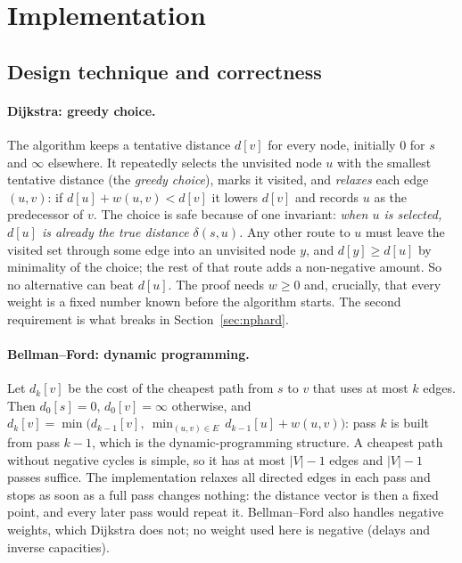 \documentclass[11pt,a4paper]{article}
\begin{document}
\section{Implementation}
\label{sec:impl}

\subsection{Design technique and correctness}
\label{sec:technique}

\paragraph{Dijkstra: greedy choice.}
The algorithm keeps a tentative distance $d[v]$ for every node, initially $0$ for $s$ and
$\infty$ elsewhere. It repeatedly selects the unvisited node $u$ with the smallest
tentative distance (the \emph{greedy choice}), marks it visited, and \emph{relaxes} each
edge $(u,v)$: if $d[u]+w(u,v)<d[v]$ it lowers $d[v]$ and records $u$ as the predecessor
of $v$. The choice is safe because of one invariant: \emph{when $u$ is selected, $d[u]$ is
already the true distance $\delta(s,u)$.} Any other route to $u$ must leave the visited set
through some edge into an unvisited node $y$, and $d[y]\ge d[u]$ by minimality of the
choice; the rest of that route adds a non-negative amount. So no alternative can beat
$d[u]$. The proof needs $w\ge 0$ and, crucially, that every weight is a fixed number known
before the algorithm starts. The second requirement is what breaks in Section~\ref{sec:nphard}.

\paragraph{Bellman--Ford: dynamic programming.}
Let $d_k[v]$ be the cost of the cheapest path from $s$ to $v$ that uses at most $k$ edges.
Then $d_0[s]=0$, $d_0[v]=\infty$ otherwise, and $d_k[v]=\min\bigl(d_{k-1}[v],\ \min_{(u,v)\in E}\,d_{k-1}[u]+w(u,v)\bigr)$:
pass $k$ is built from pass $k-1$, which is the dynamic-programming structure. A cheapest
path without negative cycles is simple, so it has at most $|V|-1$ edges and $|V|-1$ passes
suffice. The implementation relaxes all directed edges in each pass and stops as soon as a
full pass changes nothing: the distance vector is then a fixed point, and every later pass
would repeat it. Bellman--Ford also handles negative weights, which Dijkstra does not;
no weight used here is negative (delays and inverse capacities).
\end{document}
